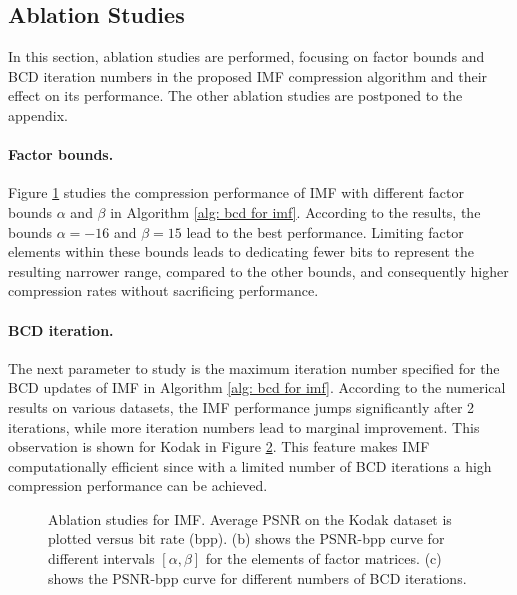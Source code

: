 \subsection{Ablation Studies} \label{sec: ablation studies}

In this section, ablation studies are performed, focusing on factor bounds and BCD iteration numbers in the proposed IMF compression algorithm and their effect on its performance. The other ablation studies are postponed to the appendix.

\paragraph{Factor bounds.} 
Figure \ref{fig: bounds ablation psnr-vs-bpp} studies the compression performance of IMF with different factor bounds $\alpha$ and $\beta$ in Algorithm \ref{alg: bcd for imf}. According to the results, the bounds $\alpha=-16$ and $\beta=15$ lead to the best performance. Limiting factor elements within these bounds leads to dedicating fewer bits to represent the resulting narrower range, compared to the other bounds, and consequently higher compression rates without sacrificing performance. 

\paragraph{BCD iteration.}
The next parameter to study is the maximum iteration number specified for the BCD updates of IMF in Algorithm \eqref{alg: bcd for imf}. 
According to the numerical results on various datasets, the IMF performance jumps significantly after 2 iterations, while more iteration numbers lead to marginal improvement. 
This observation is shown for Kodak in Figure \ref{fig: iteration ablation psnr-vs-bpp}.
This feature makes IMF computationally efficient since with a limited number of BCD iterations a high compression performance can be achieved.

\begin{figure}[t]
	\centering
	\begin{subfigure}{.5\textwidth}
		\centering
		\resizebox{.95\textwidth}{!}{}
		\caption{}
		\label{fig: bounds ablation psnr-vs-bpp}
	\end{subfigure}%
    \begin{subfigure}{.5\textwidth}
		\centering
		\resizebox{.95\textwidth}{!}{}
		\caption{}
		\label{fig: iteration ablation psnr-vs-bpp}
	\end{subfigure}
	\caption{Ablation studies for IMF. Average PSNR on the Kodak dataset is plotted versus bit rate (bpp). (b) shows the PSNR-bpp curve for different intervals $[\alpha, \beta]$ for the elements of factor matrices. (c) shows the PSNR-bpp curve for different numbers of BCD iterations.}
	\label{fig: ablation studies}
\end{figure}


